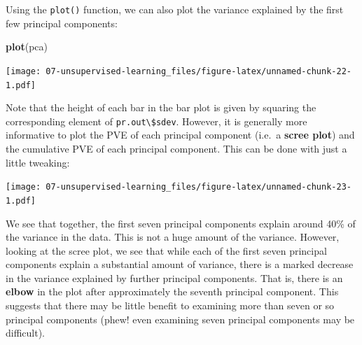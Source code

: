 \documentclass[
  openany]{book}
\newenvironment{Shaded}{\begin{snugshade}}{\end{snugshade}}
\newcommand{\DataTypeTok}[1]{\textcolor[rgb]{0.13,0.29,0.53}{#1}}
\newcommand{\DecValTok}[1]{\textcolor[rgb]{0.00,0.00,0.81}{#1}}
\newcommand{\KeywordTok}[1]{\textcolor[rgb]{0.13,0.29,0.53}{\textbf{#1}}}
\newcommand{\NormalTok}[1]{#1}
\newcommand{\OperatorTok}[1]{\textcolor[rgb]{0.81,0.36,0.00}{\textbf{#1}}}
\newcommand{\StringTok}[1]{\textcolor[rgb]{0.31,0.60,0.02}{#1}}
\begin{document}
Using the \texttt{plot()} function, we can also plot the variance explained by the
first few principal components:

\begin{Shaded}
\begin{Highlighting}[]
\KeywordTok{plot}\NormalTok{(pca)}
\end{Highlighting}
\end{Shaded}

\texttt{[image: 07-unsupervised-learning\_files/figure-latex/unnamed-chunk-22-1.pdf]}

Note that the height of each bar in the bar plot is given by squaring the
corresponding element of \texttt{pr.out\textbackslash{}\$sdev}. However, it is generally more informative to
plot the PVE of each principal component (i.e.~a \textbf{scree plot}) and the cumulative
PVE of each principal component. This can be done with just a
little tweaking:

\begin{Shaded}
\end{Shaded}

\texttt{[image: 07-unsupervised-learning\_files/figure-latex/unnamed-chunk-23-1.pdf]}

We see that together, the first seven principal components
explain around 40\% of the variance in the data. This is not a huge amount
of the variance. However, looking at the scree plot, we see that while each
of the first seven principal components explain a substantial amount of
variance, there is a marked decrease in the variance explained by further
principal components. That is, there is an \textbf{elbow} in the plot after approximately
the seventh principal component. This suggests that there may
be little benefit to examining more than seven or so principal components
(phew! even examining seven principal components may be difficult).
\end{document}
